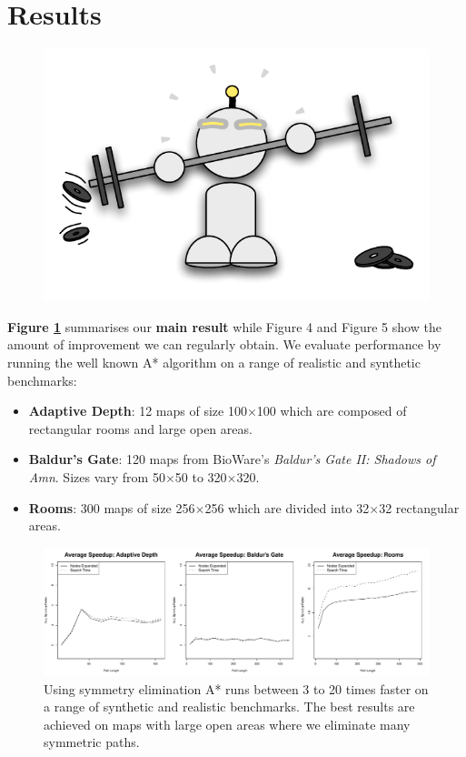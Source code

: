 \section{Results}

 \begin{figure}
    	\includegraphics[width=0.25\columnwidth, trim=0mm 10mm 0mm 0mm]{diagrams/robot_weights.pdf}
 \end{figure}
\textbf{Figure \ref{fig:speedup}} summarises our \textbf{main result} while Figure
4 and Figure 5 show the amount of improvement we
can regularly obtain. We evaluate performance by running the well known A* algorithm on a range of realistic and synthetic benchmarks:
\begin{itemize}
\item{
\textbf{Adaptive Depth}: 12 maps of size 100$\times$100 which are composed of
rectangular rooms and large open areas.
}
\item{
\textbf{Baldur's Gate}: 120 maps from BioWare's \emph{Baldur's Gate II: Shadows
of Amn}. Sizes vary from 50$\times$50 to 320$\times$320.
}
\item{
\textbf{Rooms}: 300 maps of size 256$\times$256 which are divided into 32$\times$32
rectangular areas. 
}
\end{itemize}


\begin{figure}[h]
\vspace{1em}
\label{fig:speedup}
\begin{center}
\includegraphics[width=\columnwidth]{diagrams/speedup}
\caption{Using symmetry elimination A* runs between 3 to 20 times faster on a range of synthetic
and realistic benchmarks.
The best results are achieved on maps with large open areas where we eliminate
many symmetric paths.}
\end{center}
\end{figure}

